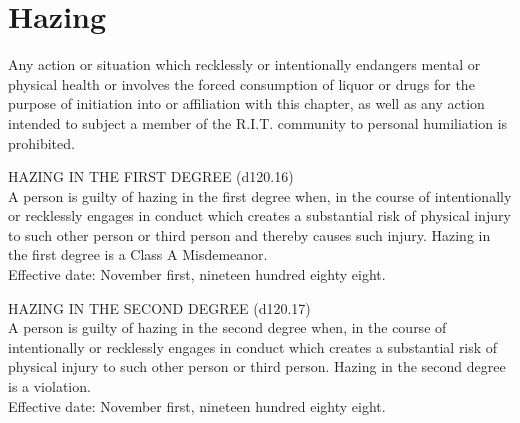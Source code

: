 \section{Hazing}
\begin{subroutines}
\item Any action or situation which recklessly or intentionally endangers mental or physical health or involves the forced consumption of liquor or drugs for the purpose of initiation into or affiliation with this chapter, as well as any action intended to subject a member of the R.I.T. community to personal humiliation is prohibited.
\item HAZING IN THE FIRST DEGREE (d120.16) \\
A person is guilty of hazing in the first degree when, in the course of intentionally or recklessly engages in conduct which creates a substantial risk of physical injury to such other person or third person and thereby causes such injury. Hazing in the first degree is a Class A Misdemeanor. \\
Effective date: November first, nineteen hundred eighty eight.
\item HAZING IN THE SECOND DEGREE (d120.17) \\
A person is guilty of hazing in the second degree when, in the course of intentionally or recklessly engages in conduct which creates a substantial risk of physical injury to such other person or third person. Hazing in the second degree is a violation. \\
Effective date: November first, nineteen hundred eighty eight.
\end{subroutines}


